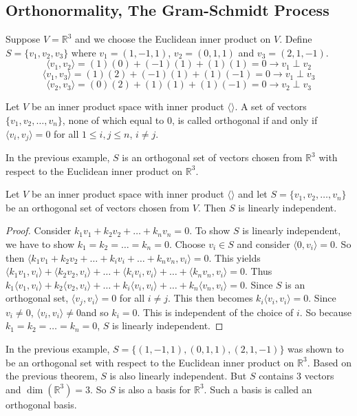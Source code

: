 \documentclass[12pt]{article}
\begin{document}
\subsection{Orthonormality, The Gram-Schmidt Process} 
\begin{example} Suppose $V = \mathbb{R}^3$ and we choose the Euclidean inner product on $V$. Define $S = \{v_1, v_2, v_3\}$ where $v_1 = (1, -1, 1)$, $v_2 = (0, 1, 1)$ and $v_3 = (2, 1, -1)$. $$\langle v_1, v_2 \rangle = (1)(0) + (-1)(1) + (1)(1) = 0 \rightarrow v_1 \perp v_2 $$ $$\langle v_1, v_3 \rangle = (1)(2) + (-1)(1) + (1)(-1) = 0 \rightarrow v_1 \perp v_3$$ $$\langle v_2, v_3 \rangle = (0)(2) + (1)(1) + (1)(-1) = 0 \rightarrow v_2 \perp v_3$$ \end{example} 
\begin{definition} Let $V$ be an inner product space with inner product $\langle \rangle$. A set of vectors $\{v_1, v_2, \dots, v_n\}$, none of which equal to 0, is called orthogonal if and only if $\langle v_i, v_j \rangle = 0$ for all $1 \leq i, j \leq n$, $i \neq j$. \end{definition} 
In the previous example, $S$ is an orthogonal set of vectors chosen from $\mathbb{R}^3$ with respect to the Euclidean inner product on $\mathbb{R}^3$. 
\begin{theorem} Let $V$ be an inner product space with inner product $\langle \rangle$ and let $S = \{v_1, v_2, \dots, v_n\}$ be an orthogonal set of vectors chosen from $V$. Then $S$ is linearly independent. \end{theorem} 
\begin{proof} Consider $k_1v_1 + k_2v_2 + \dots + k_nv_n = 0$. To show $S$ is linearly independent, we have to show $k_1 = k_2 = \dots = k_n = 0$. Choose $v_i \in S$ and consider $\langle 0, v_i \rangle = 0$. So then $\langle k_1v_1 + k_2v_2 + \dots + k_iv_i + \dots + k_nv_n, v_i \rangle = 0$. This yields $\langle k_1v_1, v_i \rangle + \langle k_2v_2, v_i \rangle + \dots + \langle k_iv_i, v_i \rangle + \dots + \langle k_nv_n, v_i \rangle = 0$. Thus $k_1\langle v_1, v_i \rangle + k_2\langle v_2, v_i \rangle + \dots + k_i\langle v_i, v_i \rangle + \dots + k_n\langle v_n, v_i\rangle = 0$. Since $S$ is an orthogonal set, $\langle v_j, v_i \rangle = 0$ for all $ i \neq j$. This then becomes $k_i \langle v_i, v_i \rangle = 0$. Since $v_i \neq 0$, $\langle v_i, v_i \rangle \neq 0$and so $k_i = 0$. This is independent of the choice of $i$. So because $k_1= k_2 = \dots = k_n = 0$, $S$ is linearly independent. \end{proof} 
In the previous example, $S = \{(1, -1, 1), (0, 1, 1), (2, 1, -1)\}$ was shown to be an orthogonal set with respect to the Euclidean inner product on $\mathbb{R}^3$. Based on the previous theorem, $S$ is also linearly independent. But $S$ contains 3 vectors and $\dim(\mathbb{R}^3) = 3$. So $S$ is also a basis for $\mathbb{R}^3$. Such a basis is called an orthogonal basis. 
\end{document}
